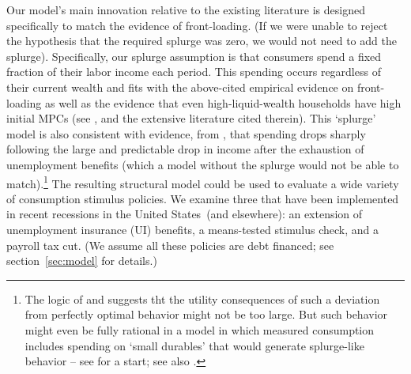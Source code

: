 \documentclass[\econtexRoot/HAFiscal]{subfiles}
\begin{document}
Our model's main innovation relative to the existing literature is designed specifically to match the evidence of front-loading.  (If we were unable to reject the hypothesis that the required splurge was zero, we would not need to add the splurge). 
Specifically, our splurge assumption is that consumers spend a fixed fraction of their labor income each period.  This spending occurs regardless of their current wealth and fits with the above-cited empirical evidence on front-loading as well as the evidence that even high-liquid-wealth households have high initial MPCs (see \cite{crawley2023MicroMacro}, and the extensive literature cited therein).  This `splurge' model is also consistent with evidence, from \cite{ganongConsumer2019}, that spending drops sharply following the large and predictable drop in income after the exhaustion of unemployment benefits (which a model without the splurge would not be able to match).\footnote{The logic of \cite{akerlof1985near} and \cite{cochrane1989sensitivity} suggests tht the utility consequences of such a deviation from perfectly optimal behavior might not be too large.  But such behavior might even be fully rational in a model in which measured consumption includes spending on `small durables' that would generate splurge-like behavior -- see \cite{bcShocksStocks} for a start; see also \cite{laibson2022simple}.}  
The resulting structural model could be used to evaluate a wide variety of consumption stimulus policies.  We examine three that have been implemented in recent recessions in the United States\ (and elsewhere): an extension of unemployment insurance (UI) benefits, a means-tested stimulus check, and a payroll tax cut.  (We assume all these policies are debt financed; see section~\ref{sec:model} for details.)  
\end{document}

